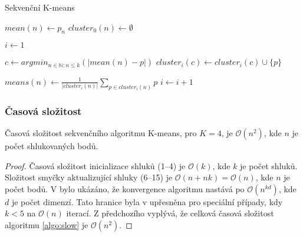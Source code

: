 \documentclass[a4paper, 11pt, fleqn]{scrartcl}
\begin{document}
      \begin{algorithm}[!h]
        \label{algo:slow}
        \SetAlgoLined
        \DontPrintSemicolon
        \caption{Sekvenční K-means}

        \vspace*{2mm}

        {
          $mean(n) \leftarrow p_n$\;
          $cluster_0(n) \leftarrow \emptyset$\;
        }

        \vspace*{2mm}

        $i \leftarrow 1$\;
        {
          {
            $c \leftarrow arg min_{n \in \mathbb{N} : n \leq k}(|mean(n) - p|)$\;
            $cluster_i(c) \leftarrow cluster_i(c) \cup \{p\}$\;
          }

          \vspace*{2mm}

            {
              $means(n) \leftarrow \frac{1}{|cluster_i(n)|} \sum_{p \in cluster_i(n)}p$
            }
          $i \leftarrow i + 1$\;
        }

        \vspace*{2mm}

      \end{algorithm}

      \subsubsection{Časová složitost}
        Časová složitost sekvenčního algoritmu K-means, pro $K = 4$, je $\mathcal{O}(n^2)$, kde $n$ je počet shlukovaných bodů.

        \begin{proof}
          Časová složitost inicializace shluků (1--4) je $\mathcal{O}(k)$, kde $k$ je počet shluků. Složitost smyčky aktualizující shluky (6--15) je $\mathcal{O}(n + nk) = \mathcal{O}(n)$, kde $n$ je počet bodů. V \cite{slow} bylo ukázáno, že konvergence algoritmu nastává po $\mathcal{O}(n^{kd})$, kde $d$ je počet dimenzí. Tato hranice byla v \cite{fast} upřesněna pro speciální případy, kdy $k < 5$ na $\mathcal{O}(n)$ iterací. Z předchozího vyplývá, že celková časová složitost algoritmu \ref{algo:slow} je $\mathcal{O}(n^2)$.
        \end{proof}
\end{document}
